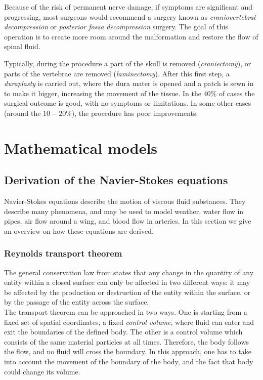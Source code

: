 \documentclass[a4paper,11pt,oneside]{book}
\begin{document}
Because of the risk of permanent nerve damage, if symptoms are significant and progressing, most surgeons would recommend a surgery known as \emph{craniovertebral decompression} or \emph{posterior fossa decompression} surgery. The goal of this operation is to create more room around the malformation and restore the flow of spinal fluid. 

Typically, during the procedure a part of the skull is removed (\textit{craniectomy}), or parts of the vertebrae are removed (\textit{laminectomy}). After this first step, a \textit{duraplasty} is carried out, where the dura mater is opened and a patch is sewn in to make it bigger, increasing the movement of the tissue.
In the $40 \%$ of cases the surgical outcome is good, with no symptoms or limitations. In some other cases (around the $10-20 \%$), the procedure has poor improvements. 



\chapter{Mathematical models}

\section{Derivation of the Navier-Stokes equations}
Navier-Stokes equations describe the motion of viscous fluid substances. They describe many phenomena, and may be used to model weather, water flow in pipes, air flow around a wing, and blood flow in arteries. In this section we give an overview on how these equations are derived. 

\subsection{Reynolds transport theorem}
The general conservation law from \cite{reynolds} states that any change in the quantity of any entity within a closed surface can only be affected in two different ways: it may be affected by the production or destruction of the entity within the surface, or by the passage of the entity across the surface. \\
The transport theorem can be approached in two ways. One is starting from a fixed set of spatial coordinates, a fixed \emph{control volume}, where fluid can enter and exit the boundaries of the defined body. The other is a control volume which consists of the same material particles at all times. Therefore, the body follows the flow, and no fluid will cross the boundary. In this approach, one has to take into account the movement of the boundary of the body, and the fact that body could change its volume. 
\end{document}
